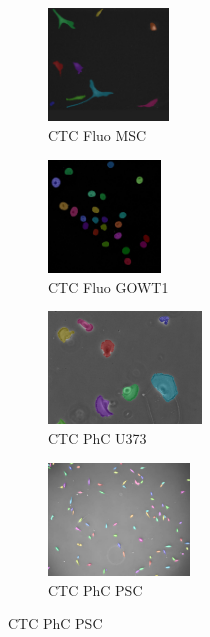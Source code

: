 \documentclass[../cellseek_paper.tex]{subfiles}
\begin{document}
\begin{figure}[H]
  \vspace{0.8em}

  \begin{subfigure}{0.23\textwidth}
    \centering
    \includegraphics[width=\textwidth,height=3cm]{images/examples/msc_segmented.jpg}
    \caption{\footnotesize CTC Fluo MSC}
    \label{fig:msc}
  \end{subfigure}
  \hfill
  \begin{subfigure}{0.23\textwidth}
    \centering
    \includegraphics[width=\textwidth,height=3cm]{images/examples/gowt1_segmented.jpg}
    \caption{\footnotesize CTC Fluo GOWT1}
    \label{fig:gowt1}
  \end{subfigure}
  \hfill
  \begin{subfigure}{0.23\textwidth}
    \centering
    \includegraphics[width=\textwidth,height=3cm]{images/examples/u373_segmented.jpg}
    \caption{\footnotesize CTC PhC U373}
    \label{fig:u373}
  \end{subfigure}
  \hfill
  \begin{subfigure}{0.23\textwidth}
    \centering
    \includegraphics[width=\textwidth,height=3cm]{images/examples/psc_segmented.jpg}
    \caption{\footnotesize CTC PhC PSC}
    \label{fig:psc}
  \end{subfigure}


\end{figure}
\end{document}
